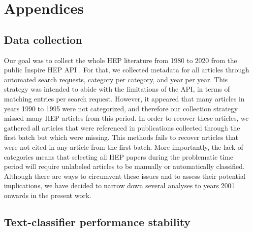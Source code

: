 \documentclass[smallextended]{svjour3}
\begin{document}
\appendix


\section{Appendices}
\label{section:appendix}

\subsection{Data collection}
\label{appendix:collection}

Our goal was to collect the whole HEP literature from 1980 to 2020 from the public Inspire HEP API \citep{InspireAPI}. For that, we collected metadata for all articles through automated search requests, category per category, and year per year. This strategy was intended to abide with the limitations of the API, in terms of matching entries per search request. However, it appeared that many articles in years 1990 to 1995 were not categorized, and therefore our collection strategy missed many HEP articles from this period. In order to recover these articles, we gathered all articles that were referenced in publications collected through the first batch but which were missing. This methods fails to recover articles that were not cited in any article from the first batch. More importantly, 
the lack of categories means that selecting all HEP papers during the problematic time period will require unlabeled articles to be manually or automatically classified. Although there are ways to circumvent these issues and to assess their potential implications, we have decided to narrow down several analyses to years 2001 onwards in the present work.


\subsection{\label{appendix:stability}Text-classifier performance stability}
\end{document}
